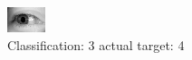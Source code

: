 \begin{figure}[h!]
\begin{center}
\includegraphics[width=0.60\columnwidth]{figures/ID3148_class_3_target_4.png}
\end{center}
\caption{ Classification: 3 actual target: 4}
\label{fig:ID3148_class_3_target_4}
\end{figure}

